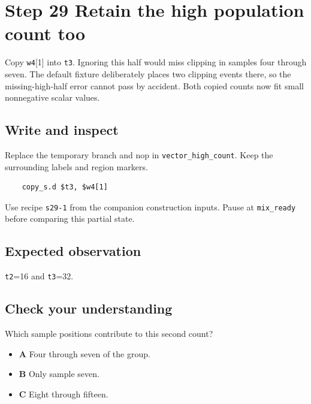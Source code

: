 \section{Step 29 Retain the high population count too}\label{pcm-s29}

Copy \texttt{w4}[1] into \texttt{t3}. Ignoring this half would miss clipping in samples four through seven. The default fixture deliberately places two clipping events there, so the missing-high-half error cannot pass by accident. Both copied counts now fit small nonnegative scalar values.

\subsection{Write and inspect}
Replace the temporary branch and nop in \texttt{vector\_high\_count}. Keep the surrounding labels and region markers.

\begin{verbatim}
    copy_s.d $t3, $w4[1]
\end{verbatim}
Use recipe \texttt{s29-1} from the companion construction inputs. Pause at \texttt{mix\_ready} before comparing this partial state.

\subsection{Expected observation}
\texttt{t2}=16 and \texttt{t3}=32.

\subsection{Check your understanding}
Which sample positions contribute to this second count?

\begin{itemize}
  \item \textbf{A} Four through seven of the group.
  \item \textbf{B} Only sample seven.
  \item \textbf{C} Eight through fifteen.
\end{itemize}
